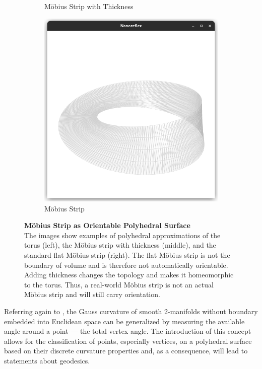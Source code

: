 \documentclass{stdlocal}
\begin{document}
\begin{figure}[t]
\begin{subfigure}[b]{0.32\linewidth}
      \caption{Möbius Strip with Thickness}
    \end{subfigure}
    \hfill
    \begin{subfigure}[b]{0.32\linewidth}
      \centering
      \includegraphics[width=\linewidth,trim={25px 50 25 200},clip]{images/polyhedral-surface-mobius-flat.png}
      \caption{Möbius Strip}
    \end{subfigure}
    \caption[Möbius Strip as Orientable Polyhedral Surface]{%
      \textbf{Möbius Strip as Orientable Polyhedral Surface}\\
      The images show examples of polyhedral approximations of the torus (left), the Möbius strip with thickness (middle), and the standard flat Möbius strip (right).
      The flat Möbius strip is not the boundary of volume and is therefore not automatically orientable.
      Adding thickness changes the topology and makes it homeomorphic to the torus.
      Thus, a real-world Möbius strip is not an actual Möbius strip and will still carry orientation.
    }
    \label{fig:oriented-polyhedral-surface-examples}
  \end{figure}

  Referring again to \textcite{polthier2006}, the Gauss curvature of smooth 2-manifolds without boundary embedded into Euclidean space can be generalized by measuring the available angle around a point --- the total vertex angle.
  The introduction of this concept allows for the classification of points, especially vertices, on a polyhedral surface based on their discrete curvature properties and, as a consequence, will lead to statements about geodesics.
\end{document}
